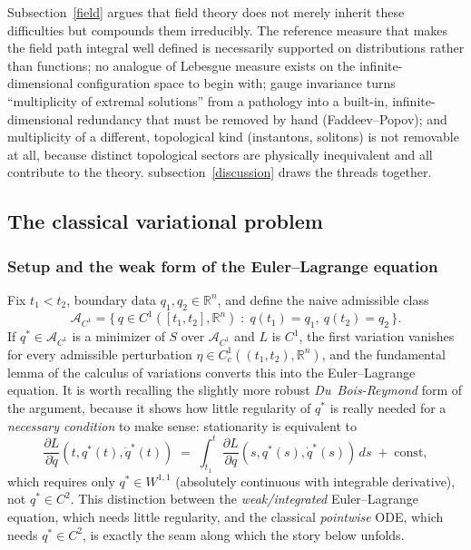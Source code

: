 Subsection~\ref{field} argues that field theory does not merely inherit these
difficulties but compounds them irreducibly. The reference measure that makes
the field path integral well defined is necessarily supported on distributions
rather than functions; no analogue of Lebesgue measure exists on the
infinite-dimensional configuration space to begin with; gauge invariance turns
``multiplicity of extremal solutions'' from a pathology into a built-in,
infinite-dimensional redundancy that must be removed by hand (Faddeev--Popov);
and multiplicity of a different, topological kind (instantons, solitons) is not
removable at all, because distinct topological sectors are physically
inequivalent and all contribute to the theory. subsection~\ref{discussion}
draws the threads together.

\subsection{The classical variational problem}
\label{classical}

\subsubsection{Setup and the weak form of the Euler--Lagrange equation}

Fix $t_1<t_2$, boundary data $q_1,q_2\in\mathbb{R}^n$, and define the naive
admissible class
\[
\mathcal{A}_{C^1} = \bigl\{\, q\in C^1([t_1,t_2],\mathbb{R}^n) 
\;:\; q(t_1)=q_1,\ q(t_2)=q_2 \,\bigr\}.
\]
If $q^\ast\in \mathcal{A}_{C^1}$ is a minimizer of $S$ over $\mathcal{A}_{C^1}$
and $L$ is $C^1$, the first variation vanishes for every admissible
perturbation $\eta\in C^1_c((t_1,t_2),\mathbb{R}^n)$, and the fundamental lemma
of the calculus of variations converts this into the Euler--Lagrange equation.
It is worth recalling the slightly more robust \emph{Du~Bois-Reymond} form of
the argument, because it shows how little regularity of $q^\ast$ is really
needed for a \emph{necessary condition} to make sense: stationarity is
equivalent to
\[
\frac{\partial L}{\partial \dot q}(t,q^\ast(t),\dot q^\ast(t)) 
\;=\; \int_{t_1}^t \frac{\partial L}{\partial q}(s,q^\ast(s),
\dot q^\ast(s))\,ds \;+\; \text{const},
\]
which requires only $q^\ast\in W^{1,1}$ (absolutely continuous with integrable
derivative), not $q^\ast\in C^2$. This distinction between the
\emph{weak/integrated} Euler--Lagrange equation, which needs little regularity,
and the classical \emph{pointwise} ODE, which needs $q^\ast\in C^2$, is exactly
the seam along which the story below unfolds.

